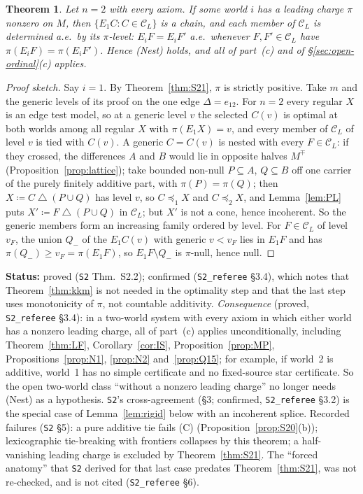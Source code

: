 \documentclass[11pt]{article}
\newtheorem{theorem}{Theorem}[section]
\theoremstyle{definition}
\theoremstyle{remark}
\newcommand{\C}{\mathcal C}
\newcommand{\sd}{\mathbin{\triangle}}
\newcommand{\src}[1]{\texttt{#1}}
\newcommand{\status}[1]{\par\smallskip\noindent\textbf{Status:} #1\par\smallskip}
\begin{document}
\begin{theorem}\label{thm:S22}
Let $n=2$ with every axiom. If some world $i$ has a leading charge $\pi$ nonzero on $M$, then $\{E_1C:C\in\C_L\}$ is a chain, and each member of $\C_L$ is determined a.e.\ by its $\pi$-level: $E_iF=E_iF'$ a.e.\ whenever $F,F'\in\C_L$ have $\pi(E_iF)=\pi(E_iF')$. Hence (Nest) holds, and all of part~(c) and of \S\ref{sec:open-ordinal}(c) applies.
\end{theorem}
\begin{proof}[Proof sketch]
Say $i=1$. By Theorem~\ref{thm:S21}, $\pi$ is strictly positive. Take $m$ and the generic levels of its proof on the one edge $\Delta=e_{12}$. For $n=2$ every regular $X$ is an edge test model, so at a generic level $v$ the selected $C(v)$ is optimal at both worlds among all regular $X$ with $\pi(E_1X)=v$, and every member of $\C_L$ of level $v$ is tied with $C(v)$. A generic $C=C(v)$ is nested with every $F\in\C_L$: if they crossed, the differences $A$ and $B$ would lie in opposite halves $M^\mp$ (Proposition~\ref{prop:lattice}); take bounded non-null $P\subseteq A$, $Q\subseteq B$ off one carrier of the purely finitely additive part, with $\pi(P)=\pi(Q)$; then $X\coloneqq C\sd(P\cup Q)$ has level $v$, so $C\preceq_1X$ and $C\preceq_2X$, and Lemma~\ref{lem:PL} puts $X'\coloneqq F\sd(P\cup Q)$ in $\C_L$; but $X'$ is not a cone, hence incoherent. So the generic members form an increasing family ordered by level. For $F\in\C_L$ of level $v_F$, the union $Q_-$ of the $E_1C(v)$ with generic $v<v_F$ lies in $E_1F$ and has $\pi(Q_-)\ge v_F=\pi(E_1F)$, so $E_1F\setminus Q_-$ is $\pi$-null, hence null.
\end{proof}
\status{proved (\src{S2} Thm.~S2.2); confirmed (\src{S2\_referee} \S3.4), which notes that Theorem~\ref{thm:kkm} is not needed in the optimality step and that the last step uses monotonicity of $\pi$, not countable additivity. \emph{Consequence} (proved, \src{S2\_referee} \S3.4): in a two-world system with every axiom in which either world has a nonzero leading charge, all of part~(c) applies unconditionally, including Theorem~\ref{thm:LF}, Corollary~\ref{cor:IS}, Proposition~\ref{prop:MP}, Propositions~\ref{prop:N1}, \ref{prop:N2} and~\ref{prop:Q15}; for example, if world~2 is additive, world~1 has no simple certificate and no fixed-source star certificate. So the open two-world class ``without a nonzero leading charge'' no longer needs (Nest) as a hypothesis. \src{S2}'s cross-agreement (\S3; confirmed, \src{S2\_referee} \S3.2) is the special case of Lemma~\ref{lem:rigid} below with an incoherent splice. Recorded failures (\src{S2} \S5): a pure additive tie fails (C) (Proposition~\ref{prop:S20}(b)); lexicographic tie-breaking with frontiers collapses by this theorem; a half-vanishing leading charge is excluded by Theorem~\ref{thm:S21}. The ``forced anatomy'' that \src{S2} derived for that last case predates Theorem~\ref{thm:S21}, was not re-checked, and is not cited (\src{S2\_referee} \S6).}
\end{document}
